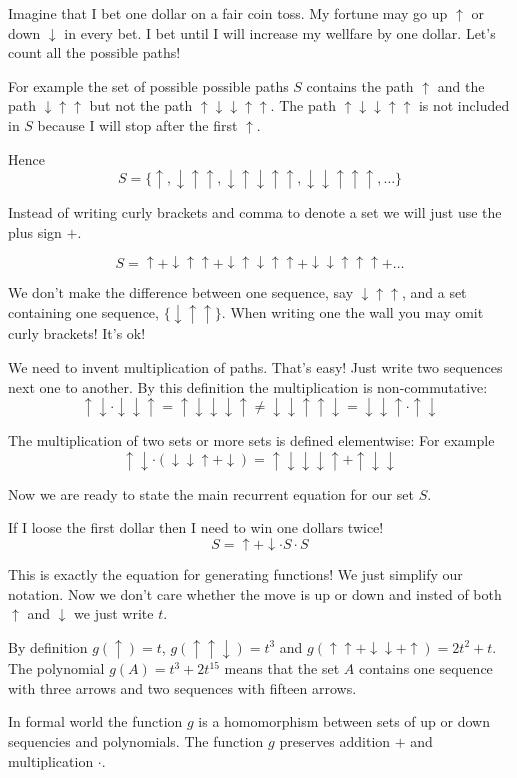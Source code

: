 \documentclass{article}
\newcommand{\up}{\uparrow}
\newcommand{\down}{\downarrow}
\begin{document}
Imagine that I bet one dollar on a fair coin toss. My fortune may go up $\up$ or down $\down$ in every bet.
I bet until I will increase my wellfare by one dollar. Let's count all the possible paths!

For example the set of possible possible paths $S$ contains the path $\up$ and the path $\down\up\up$ but not the path $\up\down\down\up\up$. 
The path $\up\down\down\up\up$ is not included in $S$ because I will stop after the first $\up$. 

Hence
\[
S = \{ \up, \down\up\up, \down\up\down\up\up, \down\down\up\up\up, \ldots \}	
\]

Instead of writing curly brackets and comma to denote a set we will just use the plus sign $+$.

\[
S =  \up + \down\up\up + \down\up\down\up\up + \down\down\up\up\up + \ldots 	
\]

We don't make the difference between one sequence, say $\down\up\up$, and 
a set containing one sequence, $\{\down\up\up \}$. 
When writing one the wall you may omit curly brackets! It's ok!


We need to invent multiplication of paths. That's easy! Just write two sequences next one to another.
By this definition the multiplication is non-commutative:
\[
\up\down \cdot \down \down \up = \up\down \down \down \up  \neq \down \down \up \up\down =  \down \down \up \cdot \up\down 
\]

The multiplication of two sets or more sets is defined elementwise:
For example
\[
	\up\down \cdot (\down \down \up + \down) = \up\down\down \down \up + \up\down \down
\]

Now we are ready to state the main recurrent equation for our set $S$. 


If I loose the first dollar then I need to win one dollars twice!
\[
S = \up + \down \cdot S \cdot S	
\]

This is exactly the equation for generating functions! 
We just simplify our notation. 
Now we don't care whether the move is up or down and insted of both $\up$ and $\down$ we just write $t$. 

By definition $g(\up) = t$, $g(\up\up\down) = t^3$ and $g(\up\up + \down\down +\up) = 2t^2 + t$.
The polynomial $g(A) = t^3 + 2t^{15}$ means that 
the set $A$ contains one sequence with three arrows and two sequences with fifteen arrows.

In formal world the function $g$ is a homomorphism between sets of up or down sequencies and polynomials. 
The function $g$ preserves addition $+$ and multiplication $\cdot$.
\end{document}
